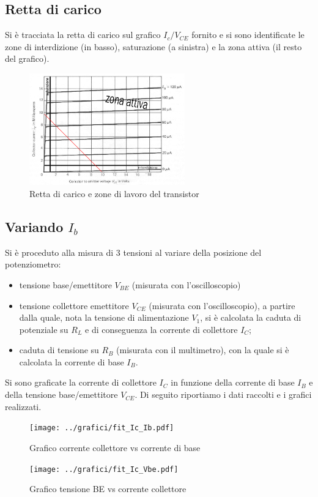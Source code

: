 \documentclass[10pt,a4paper]{article}
\begin{document}
\subsection{Retta di carico}
Si è tracciata la retta di carico sul grafico $I_c/V_{CE}$ fornito e si sono identificate le zone di interdizione (in basso), saturazione (a sinistra) e la zona attiva (il resto del grafico).
\begin{figure}[h]
	\centering
	\includegraphics[width=0.6\textwidth]{../grafici/retta_carico.png}
	\caption{Retta di carico e zone di lavoro del transistor}
	\label{retta_carico}
\end{figure}
\subsection{Variando $I_b$} %
Si è proceduto alla misura di 3 tensioni al variare della posizione del potenziometro:
\begin{itemize}
	\item tensione base/emettitore $V_{BE}$ (misurata con l'oscilloscopio)
	\item tensione collettore emettitore $V_{CE}$ (misurata con l'oscilloscopio), a partire dalla quale, nota la tensione di alimentazione $V_1$, si è calcolata la caduta di potenziale su $R_L$ e di conseguenza la corrente di collettore $I_C$;
	\item caduta di tensione su $R_B$ (misurata con il multimetro), con la quale si è calcolata la corrente di base $I_B$.
\end{itemize}
Si sono graficate la corrente di collettore $I_C$ in funzione della corrente di base $I_B$ e della tensione base/emettitore $V_{CE}$.
Di seguito riportiamo i dati raccolti e i grafici realizzati.

\begin{figure}[h!]
	\centering
	\begin{minipage}[h!]{0.4\textwidth}
		\centering
		\resizebox{1\textwidth}{!}{
			}
	\end{minipage}
	\begin{minipage}[d]{0.59\textwidth}
		\centering
		\texttt{[image: ../grafici/fit\_Ic\_Ib.pdf]}
		\caption{Grafico corrente collettore vs corrente di base}
		\label{ibic}
		\centering
		\texttt{[image: ../grafici/fit\_Ic\_Vbe.pdf]}
		\caption{Grafico tensione BE vs corrente collettore}
		\label{vbeic}
		\end{minipage}
\end{figure}
\end{document}
